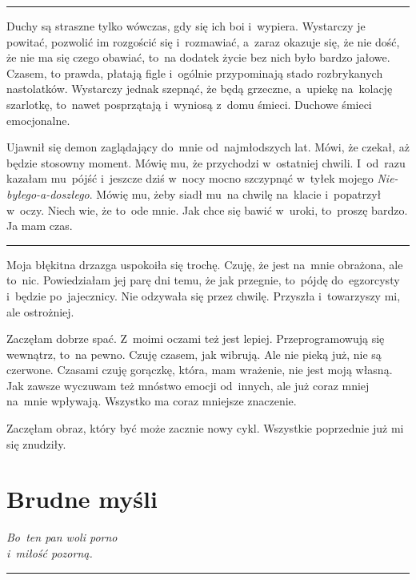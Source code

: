 \documentclass[9pt, a5paper]{memoir}
\begin{document}
\fancybreak{* \quad * \quad *}

Duchy są straszne tylko wówczas, gdy się ich boi i~wypiera. Wystarczy je powitać, pozwolić im rozgościć się i~rozmawiać, a~zaraz okazuje się, że nie dość, że nie ma się czego obawiać, to~na dodatek życie bez nich było bardzo jałowe. Czasem, to prawda, płatają figle i~ogólnie przypominają stado rozbrykanych nastolatków. Wystarczy jednak szepnąć, że będą grzeczne, a~upiekę na~kolację szarlotkę, to~nawet posprzątają i~wyniosą z~domu śmieci. Duchowe śmieci emocjonalne.

Ujawnił się demon zaglądający do~mnie od~najmłodszych lat. Mówi, że czekał, aż będzie stosowny moment. Mówię mu, że przychodzi w~ostatniej chwili. I~od~razu kazałam mu~pójść i~jeszcze dziś w~nocy mocno szczypnąć w~tyłek mojego \textit{Nie-byłego-a-doszłego}. Mówię mu, żeby siadł mu~na chwilę na~klacie i~popatrzył w~oczy. Niech wie, że to~ode mnie. Jak chce się bawić w~uroki, to~proszę bardzo. Ja mam czas.

\fancybreak{* \quad * \quad *}

Moja błękitna drzazga uspokoiła się trochę. Czuję, że jest na~mnie obrażona, ale to~nic. Powiedziałam jej parę dni temu, że jak przegnie, to~pójdę do~egzorcysty i~będzie po~jajecznicy. Nie odzywała się przez chwilę. Przyszła i~towarzyszy mi, ale ostrożniej.

Zaczęłam dobrze spać. Z~moimi oczami też jest lepiej. Przeprogramowują się wewnątrz, to~na pewno. Czuję czasem, jak wibrują. Ale nie pieką już, nie są czerwone. Czasami czuję gorączkę, która, mam wrażenie, nie jest moją własną. Jak zawsze wyczuwam też mnóstwo emocji od~innych, ale już coraz mniej na~mnie wpływają. Wszystko ma coraz mniejsze znaczenie.

Zaczęłam obraz, który być może zacznie nowy cykl. Wszystkie poprzednie już mi się znudziły.

\newpage
\section{Brudne myśli}
{
\itshape
Bo~ten pan woli porno\\
i~miłość pozorną.
}

\fancybreak{* \quad * \quad *}
\end{document}
